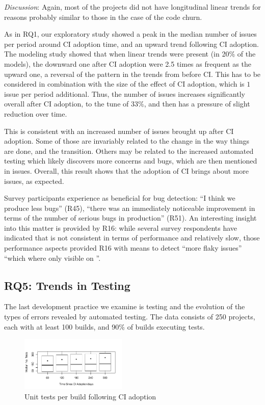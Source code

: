 \smallskip\noindent \emph{Discussion}:
Again, most of the projects did not have longitudinal linear trends for reasons probably similar to those in the case of the code churn.

As in RQ1, our exploratory study showed a peak in the median number of issues per period around CI adoption time, and an upward trend following CI adoption.
The modeling study showed that when linear trends were present (in 20\% 
of the models), the downward one after CI adoption were 2.5 times as frequent 
as the upward one, a reversal of the pattern in the trends from before CI.
This has to be considered in combination with the size of the effect of CI adoption, which is $1$ issue per period additional.
Thus, the number of issues increases significantly overall after CI adoption, to the tune of $33\%$, and then has a pressure of slight reduction over time.

This is consistent with an increased number of issues brought up after CI adoption. Some of those are invariably related to the change in the way things are done, and the transition. Others may be related to the increased automated testing which likely discovers more concerns and bugs, which are then mentioned in issues.
Overall, this result shows that the adoption of CI brings about more issues, as expected.

Survey participants experience \Tvi as beneficial for bug detection: ``I think we produce less bugs'' (R45), ``there was an immediately noticeable improvement in terms of the number of serious bugs in production'' (R51). 
An interesting insight into this matter is provided by R16: while several survey respondents have indicated that \Tvis is not consistent in terms of performance and relatively slow, those performance aspects provided R16 with means to detect ``more flaky issues'' ``which where only visible on \Tvi''. 

\subsection{RQ5: Trends in Testing}

The last development practice we examine is testing and the evolution 
of the types of errors revealed by automated testing.
The data consists of 250 projects, each with at least 100 builds, and 90\% 
of builds executing tests.

\begin{figure}[!t]
\centering
\includegraphics[width=0.45\textwidth, clip=true, trim=0 15 15 50]{tests.pdf}
\caption{Unit tests per build following CI adoption}
\label{Fig:Tests}
\end{figure}

